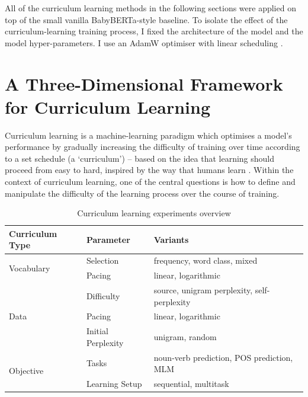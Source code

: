 All of the curriculum learning methods in the following sections were applied on top of the small vanilla BabyBERTa-style baseline. To isolate the effect of the curriculum-learning training process, I fixed the architecture of the model and the model hyper-parameters. I use an AdamW optimiser with linear scheduling \citep{loshchilov2019decoupled}.

\section{A Three-Dimensional Framework for Curriculum Learning}
Curriculum learning \citep{bengio2009curriculum} is a machine-learning paradigm which optimises a model's performance by gradually increasing the difficulty of training over time according to a set schedule (a `curriculum') -- based on the idea that learning should proceed from easy to hard, inspired by the way that humans learn \citep{elman1993learning}.
Within the context of curriculum learning, one of the central questions is how to define and manipulate the difficulty of the learning process over the course of training. 

\begin{table}[H]
    \centering
    \small
    \begin{tabular}{lll}
    \toprule
    \textbf{Curriculum Type} & \textbf{Parameter} &\textbf{Variants} \\
    \midrule
     \multirow{2}{*}{Vocabulary} & Selection & frequency, word class, mixed \\
     & Pacing & linear, logarithmic \\
     \midrule
     \multirow{3}{*}{Data} & Difficulty & source, unigram perplexity, self-perplexity \\
     & Pacing & linear, logarithmic \\
     & Initial Perplexity & unigram, random \\
      \midrule
     \multirow{2}{*}{Objective} & Tasks & noun-verb prediction, POS prediction, MLM\\
     & Learning Setup & sequential, multitask \\
    \bottomrule
    \end{tabular}
    \caption{\label{tbl:configurations} Curriculum learning experiments overview}
\end{table}

